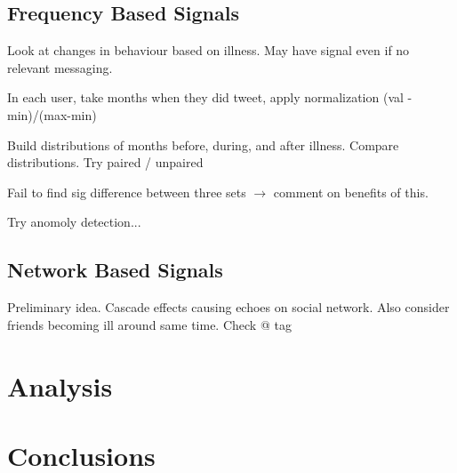 \documentclass{acm_proc_article-sp}
\begin{document}
\subsection{Frequency Based Signals}

Look at changes in behaviour based on illness. May have signal even if no  relevant messaging.

In each user, take months when they did tweet, apply normalization (val - min)/(max-min)

Build distributions of months before, during, and after illness. Compare distributions. Try paired / unpaired

Fail to find sig difference between three sets \(\to\) comment on benefits of this.

Try anomoly detection...







\subsection{Network Based Signals}

Preliminary idea. Cascade effects causing echoes on social network. Also consider friends becoming ill around same time. Check @ tag

\section{Analysis}

\section{Conclusions}

\end{document}
